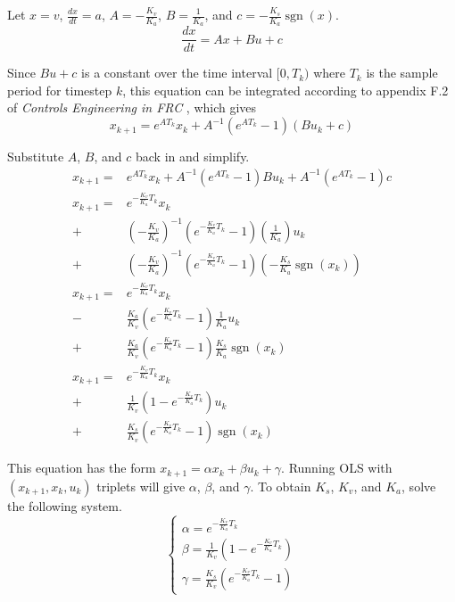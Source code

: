 \documentclass[10pt,conference,compsoc]{IEEEtran}
\DeclareMathOperator{\sgn}{sgn}
\begin{document}
Let $x = v$, $\frac{dx}{dt} = a$, $A = -\frac{K_v}{K_a}$, $B = \frac{1}{K_a}$,
and $c = -\frac{K_s}{K_a}\sgn(x)$.
\begin{equation*}
  \frac{dx}{dt} = Ax + Bu + c
\end{equation*}

Since $Bu + c$ is a constant over the time interval $[0, T_k)$ where $T_k$ is
the sample period for timestep $k$, this equation can be integrated according to
appendix F.2 of \textit{Controls Engineering in FRC} \cite{bib:controls-in-frc},
which gives
\begin{equation*}
  x_{k+1} = e^{AT_k} x_k + A^{-1} (e^{AT_k} - 1) (Bu_k + c)
\end{equation*}

Substitute $A$, $B$, and $c$ back in and simplify.
\begin{equation*}
  \begin{aligned}
    x_{k+1} =& e^{AT_k} x_k + A^{-1} (e^{AT_k} - 1)Bu_k +
      A^{-1} (e^{AT_k} - 1)c \\
    x_{k+1} =& e^{-\frac{K_v}{K_a} T_k} x_k \\
      +& \left(-\frac{K_v}{K_a}\right)^{-1}
        \left(e^{-\frac{K_v}{K_a} T_k} - 1\right)
        \left(\frac{1}{K_a}\right) u_k \\
      +& \left(-\frac{K_v}{K_a}\right)^{-1}
        \left(e^{-\frac{K_v}{K_a} T_k} - 1\right)
        \left(-\frac{K_s}{K_a}\sgn(x_k)\right) \\
    x_{k+1} =& e^{-\frac{K_v}{K_a} T_k} x_k \\
      -& \frac{K_a}{K_v}
        \left(e^{-\frac{K_v}{K_a} T_k} - 1\right)
        \frac{1}{K_a} u_k \\
      +& \frac{K_a}{K_v}
        \left(e^{-\frac{K_v}{K_a} T_k} - 1\right)
        \frac{K_s}{K_a}\sgn(x_k) \\
    x_{k+1} =& e^{-\frac{K_v}{K_a} T_k} x_k \\
      +& \frac{1}{K_v}
        \left(1 - e^{-\frac{K_v}{K_a} T_k}\right) u_k \\
      +& \frac{K_s}{K_v}
        \left(e^{-\frac{K_v}{K_a} T_k} - 1\right)\sgn(x_k)
  \end{aligned}
\end{equation*}

This equation has the form $x_{k+1} = \alpha x_k + \beta u_k + \gamma$. Running
OLS with $(x_{k+1}, x_k, u_k)$ triplets will give $\alpha$, $\beta$, and
$\gamma$. To obtain $K_s$, $K_v$, and $K_a$, solve the following system.
\begin{equation*}
  \begin{cases}
    \alpha = e^{-\frac{K_v}{K_a} T_k} \\
    \beta = \frac{1}{K_v}\left(1 - e^{-\frac{K_v}{K_a} T_k}\right) \\
    \gamma = \frac{K_s}{K_v}\left(e^{-\frac{K_v}{K_a} T_k} - 1\right)
  \end{cases}
\end{equation*}
\end{document}
